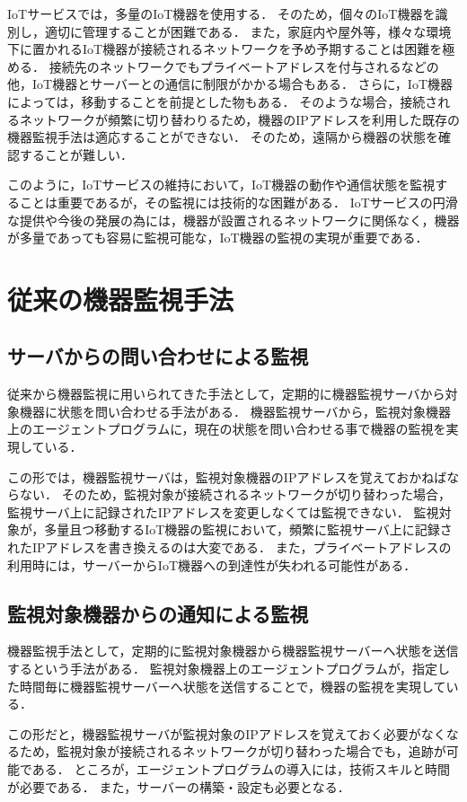 IoTサービスでは，多量のIoT機器を使用する．
そのため，個々のIoT機器を識別し，適切に管理することが困難である．
また，家庭内や屋外等，様々な環境下に置かれるIoT機器が接続されるネットワークを予め予期することは困難を極める．
接続先のネットワークでもプライベートアドレスを付与されるなどの他，IoT機器とサーバーとの通信に制限がかかる場合もある．
さらに，IoT機器によっては，移動することを前提とした物もある．
そのような場合，接続されるネットワークが頻繁に切り替わりるため，機器のIPアドレスを利用した既存の機器監視手法は適応することができない．
そのため，遠隔から機器の状態を確認することが難しい．
\medskip

このように，IoTサービスの維持において，IoT機器の動作や通信状態を監視することは重要であるが，その監視には技術的な困難がある．
IoTサービスの円滑な提供や今後の発展の為には，機器が設置されるネットワークに関係なく，機器が多量であっても容易に監視可能な，IoT機器の監視の実現が重要である．


\section{従来の機器監視手法}
\subsection{サーバからの問い合わせによる監視}
	従来から機器監視に用いられてきた手法として，定期的に機器監視サーバから対象機器に状態を問い合わせる手法がある．
	機器監視サーバから，監視対象機器上のエージェントプログラムに，現在の状態を問い合わせる事で機器の監視を実現している．
	\medskip

	この形では，機器監視サーバは，監視対象機器のIPアドレスを覚えておかねばならない．
	そのため，監視対象が接続されるネットワークが切り替わった場合，監視サーバ上に記録されたIPアドレスを変更しなくては監視できない．
	監視対象が，多量且つ移動するIoT機器の監視において，頻繁に監視サーバ上に記録されたIPアドレスを書き換えるのは大変である．
	また，プライベートアドレスの利用時には，サーバーからIoT機器への到達性が失われる可能性がある．

\subsection{監視対象機器からの通知による監視}
	機器監視手法として，定期的に監視対象機器から機器監視サーバーへ状態を送信するという手法がある．
	監視対象機器上のエージェントプログラムが，指定した時間毎に機器監視サーバーへ状態を送信することで，機器の監視を実現している．
	\medskip

	この形だと，機器監視サーバが監視対象のIPアドレスを覚えておく必要がなくなるため，監視対象が接続されるネットワークが切り替わった場合でも，追跡が可能である．
	ところが，エージェントプログラムの導入には，技術スキルと時間が必要である．
	また，サーバーの構築・設定も必要となる．

